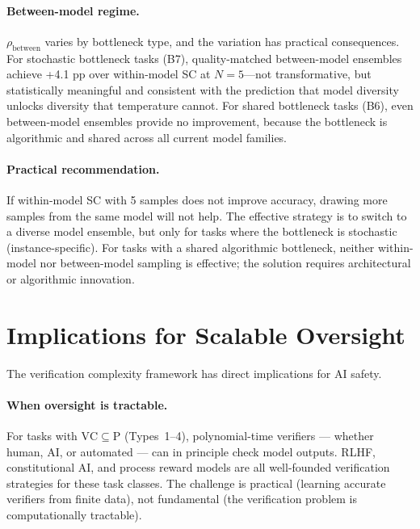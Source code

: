\documentclass{article}
\theoremstyle{definition}
\theoremstyle{remark}
\newcommand{\PTIME}{\mathrm{P}}
\newcommand{\VC}{\mathrm{VC}}           %
\begin{document}
\paragraph{Between-model regime.}
$\rho_{\text{between}}$ varies by bottleneck type, and the variation has practical consequences.
For stochastic bottleneck tasks (B7), quality-matched between-model ensembles achieve +4.1 pp over within-model SC at $N = 5$---not transformative, but statistically meaningful and consistent with the prediction that model diversity unlocks diversity that temperature cannot.
For shared bottleneck tasks (B6), even between-model ensembles provide no improvement, because the bottleneck is algorithmic and shared across all current model families.

\paragraph{Practical recommendation.}
If within-model SC with 5 samples does not improve accuracy, drawing more samples from the same model will not help.
The effective strategy is to switch to a diverse model ensemble, but only for tasks where the bottleneck is stochastic (instance-specific).
For tasks with a shared algorithmic bottleneck, neither within-model nor between-model sampling is effective; the solution requires architectural or algorithmic innovation.

\section{Implications for Scalable Oversight}
\label{sec:oversight}

The verification complexity framework has direct implications for AI safety.

\paragraph{When oversight is tractable.}
For tasks with $\VC \subseteq \PTIME$ (Types~1--4), polynomial-time verifiers --- whether human, AI, or automated --- can in principle check model outputs.
RLHF, constitutional AI, and process reward models are all well-founded verification strategies for these task classes.
The challenge is practical (learning accurate verifiers from finite data), not fundamental (the verification problem is computationally tractable).
\end{document}
